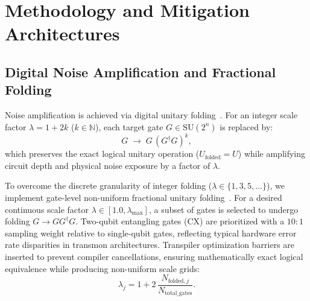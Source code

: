 \section{Methodology and Mitigation Architectures}

\subsection{Digital Noise Amplification and Fractional Folding}
Noise amplification is achieved via digital unitary folding~\cite{giurgica2020}. For an integer scale factor $\lambda = 1 + 2k$ ($k \in \mathbb{N}$), each target gate $G \in \mathrm{SU}(2^n)$ is replaced by:
\begin{equation}
G \;\longrightarrow\; G\,(G^\dagger G)^k,
\label{eq:integer_folding}
\end{equation}
which preserves the exact logical unitary operation ($U_{\mathrm{folded}} = U$) while amplifying circuit depth and physical noise exposure by a factor of $\lambda$.

To overcome the discrete granularity of integer folding ($\lambda \in \{1, 3, 5, \dots\}$), we implement gate-level non-uniform fractional unitary folding~\cite{giurgica2020}. For a desired continuous scale factor $\lambda \in [1.0, \lambda_{\max}]$, a subset of gates is selected to undergo folding $G \to G G^\dagger G$. Two-qubit entangling gates ($\mathrm{CX}$) are prioritized with a $10:1$ sampling weight relative to single-qubit gates, reflecting typical hardware error rate disparities in transmon architectures. Transpiler optimization barriers are inserted to prevent compiler cancellations, ensuring mathematically exact logical equivalence while producing non-uniform scale grids:
\begin{equation}
\lambda_j = 1 + 2\,\frac{N_{\mathrm{folded}, j}}{N_{\mathrm{total\_gates}}}.
\end{equation}

